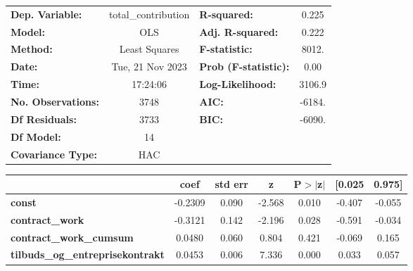\begin{center}
\begin{tabular}{lclc}
\toprule
\textbf{Dep. Variable:}                     & total\_contribution & \textbf{  R-squared:         } &     0.225   \\
\textbf{Model:}                             &         OLS         & \textbf{  Adj. R-squared:    } &     0.222   \\
\textbf{Method:}                            &    Least Squares    & \textbf{  F-statistic:       } &     8012.   \\
\textbf{Date:}                              &   Tue, 21 Nov 2023  & \textbf{  Prob (F-statistic):} &     0.00    \\
\textbf{Time:}                              &       17:24:06      & \textbf{  Log-Likelihood:    } &    3106.9   \\
\textbf{No. Observations:}                  &          3748       & \textbf{  AIC:               } &    -6184.   \\
\textbf{Df Residuals:}                      &          3733       & \textbf{  BIC:               } &    -6090.   \\
\textbf{Df Model:}                          &            14       & \textbf{                     } &             \\
\textbf{Covariance Type:}                   &         HAC         & \textbf{                     } &             \\
\bottomrule
\end{tabular}
\begin{tabular}{lcccccc}
                                            & \textbf{coef} & \textbf{std err} & \textbf{z} & \textbf{P$> |$z$|$} & \textbf{[0.025} & \textbf{0.975]}  \\
\midrule
\textbf{const}                              &      -0.2309  &        0.090     &    -2.568  &         0.010        &       -0.407    &       -0.055     \\
\textbf{contract\_work}                     &      -0.3121  &        0.142     &    -2.196  &         0.028        &       -0.591    &       -0.034     \\
\textbf{contract\_work\_cumsum}             &       0.0480  &        0.060     &     0.804  &         0.421        &       -0.069    &        0.165     \\
\textbf{tilbuds\_og\_entreprisekontrakt}    &       0.0453  &        0.006     &     7.336  &         0.000        &        0.033    &        0.057     \\

\end{tabular}
\end{center}
